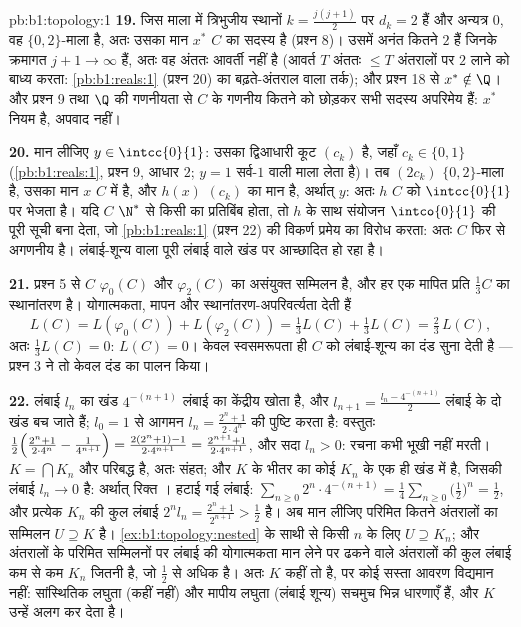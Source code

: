 \begin{solution}{pb:b1:topology:1}
\textbf{19.} जिस माला में त्रिभुजीय स्थानों $k = \frac{j(j+1)}{2}$ पर $d_k =
2$ हैं और अन्यत्र $0$, वह $\{0,2\}$-माला है, अतः उसका मान $x^*$ $C$ का सदस्य
है (प्रश्न 8)। उसमें अनंत कितने $2$ हैं जिनके क्रमागत  $j + 1 \to
\infty$ हैं, अतः वह अंततः आवर्ती नहीं है (आवर्त $T$ अंततः $\leq T$ अंतरालों
पर $2$ लाने को बाध्य करता: \cref{pb:b1:reals:1} (प्रश्न 20) का बढ़ते-अंतराल
वाला तर्क); और प्रश्न 18 से $x^* \notin \Q$। और प्रश्न 9 तथा $\Q$ की गणनीयता
से $C$ के गणनीय कितने को छोड़कर सभी सदस्य अपरिमेय हैं: $x^*$ नियम है, अपवाद
नहीं।

\textbf{20.} मान लीजिए $y \in \intcc{0}{1}$: उसका द्विआधारी कूट $(c_k)$ है,
जहाँ $c_k \in \{0, 1\}$ (\cref{pb:b1:reals:1}, प्रश्न 9, आधार $2$; $y = 1$
सर्व-$1$ वाली माला लेता है)। तब $(2c_k)$ $\{0,2\}$-माला है, उसका मान $x$ $C$
में है, और $h(x)$ $(c_k)$ का मान है, अर्थात् $y$: अतः $h$ $C$ को
$\intcc{0}{1}$ पर भेजता है। यदि $C$ $\N^*$ से किसी  का प्रतिबिंब
होता, तो $h$ के साथ संयोजन $\intco{0}{1}$ की पूरी सूची बना देता, जो
\cref{pb:b1:reals:1} (प्रश्न 22) की विकर्ण प्रमेय का विरोध करता: अतः $C$ फिर
से अगणनीय है। लंबाई-शून्य वाला  पूरी लंबाई वाले खंड पर आच्छादित हो
रहा है।

\textbf{21.} प्रश्न 5 से $C$ $\varphi_0(C)$ और $\varphi_2(C)$ का असंयुक्त
सम्मिलन है, और हर एक मापित प्रति $\frac13 C$ का स्थानांतरण है। योगात्मकता,
मापन और स्थानांतरण-अपरिवर्त्यता देती हैं
\[
L(C) = L(\varphi_0(C)) + L(\varphi_2(C))
= \tfrac13 L(C) + \tfrac13 L(C) = \tfrac23\,L(C),
\]
अतः $\frac13 L(C) = 0$: $L(C) = 0$। केवल स्वसमरूपता ही $C$ को लंबाई-शून्य का
दंड सुना देती है --- प्रश्न 3 ने तो केवल दंड का पालन किया।

\textbf{22.} लंबाई $l_n$ का खंड $4^{-(n+1)}$ लंबाई का केंद्रीय  खोता
है, और $l_{n+1} = \frac{l_n - 4^{-(n+1)}}{2}$ लंबाई के दो खंड बच जाते हैं;
$l_0 = 1$ से आगमन $l_n = \frac{2^n + 1}{2\cdot4^n}$ की पुष्टि करता है:
वस्तुतः $\frac12\Bigl(\frac{2^n+1}{2\cdot4^n} - \frac{1}{4^{n+1}}\Bigr) =
\frac{2(2^n + 1) - 1}{2\cdot4^{n+1}} = \frac{2^{n+1} + 1}{2\cdot4^{n+1}}$,
और सदा $l_n > 0$: रचना कभी भूखी नहीं मरती। $K = \bigcap K_n$  और
परिबद्ध है, अतः संहत; और $K$ के भीतर का कोई  $K_n$ के एक ही खंड में
है, जिसकी लंबाई $l_n \to 0$ है: अर्थात् रिक्त । हटाई गई लंबाई:
$\sum_{n\geq0} 2^n \cdot 4^{-(n+1)} =
\frac14\sum_{n\geq0}\bigl(\frac12\bigr)^n = \frac12$, और प्रत्येक $K_n$ की
कुल लंबाई $2^n l_n = \frac{2^n + 1}{2^{n+1}} > \frac12$ है। अब मान लीजिए
परिमित कितने  अंतरालों का सम्मिलन $U \supseteq K$ है।
\cref{ex:b1:topology:nested} के साथी  से किसी $n$ के लिए $U \supseteq
K_n$; और अंतरालों के परिमित सम्मिलनों पर लंबाई की योगात्मकता मान लेने पर
ढकने वाले अंतरालों की कुल लंबाई कम से कम $K_n$ जितनी है, जो $\frac12$ से
अधिक है। अतः $K$ कहीं  तो है, पर कोई सस्ता आवरण विद्यमान नहीं: सांस्थितिक
लघुता (कहीं  नहीं) और मापीय लघुता (लंबाई शून्य) सचमुच भिन्न धारणाएँ हैं,
और $K$ उन्हें अलग कर देता है।


\end{solution}

